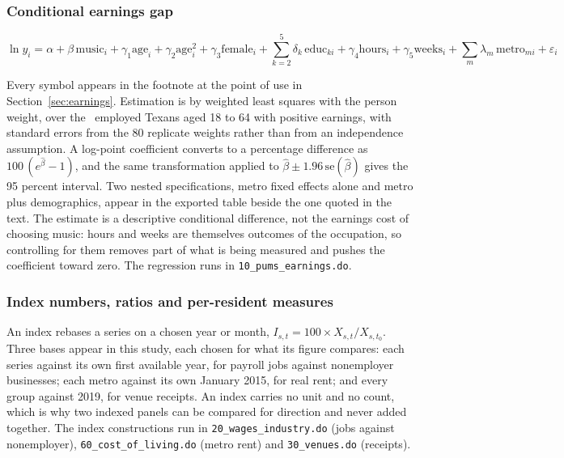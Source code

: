 \subsubsection*{Conditional earnings gap}

\[
\ln y_i = \alpha + \beta\,\mathrm{music}_i
  + \gamma_1 \mathrm{age}_i + \gamma_2 \mathrm{age}_i^{2}
  + \gamma_3 \mathrm{female}_i
  + \sum_{k=2}^{5}\delta_k\,\mathrm{educ}_{ki}
  + \gamma_4 \mathrm{hours}_i + \gamma_5 \mathrm{weeks}_i
  + \sum_{m}\lambda_m\,\mathrm{metro}_{mi} + \varepsilon_i
\]

Every symbol appears in the footnote at the point of use in
Section~\ref{sec:earnings}. Estimation is by weighted least squares with the
person weight, over the \NPumsRegN\ employed Texans aged 18 to 64 with
positive earnings, with standard errors from the 80 replicate weights
rather than from an independence assumption. A log-point coefficient
converts to a percentage difference as \(100\,(e^{\hat\beta} - 1)\), and the
same transformation applied to \(\hat\beta \pm 1.96\,\mathrm{se}(\hat\beta)\)
gives the 95 percent interval. Two nested specifications, metro fixed
effects alone and metro plus demographics, appear in the exported table
beside the one quoted in the text. The estimate is a descriptive conditional
difference, not the earnings cost of choosing music: hours and weeks are
themselves outcomes of the occupation, so controlling for them removes part
of what is being measured and pushes the coefficient toward zero. The
regression runs in \texttt{10\_pums\_earnings.do}.

\subsubsection*{Index numbers, ratios and per-resident measures}

An index rebases a series on a chosen year or month,
\(I_{s,t} = 100 \times X_{s,t}/X_{s,t_0}\). Three bases appear in this
study, each chosen for what its figure compares: each series against its
own first available year, for payroll jobs against nonemployer businesses;
each metro against its own January 2015, for real rent; and every group
against 2019, for venue receipts. An index carries no unit and no count,
which is why two indexed panels can be compared for direction and never
added together. The index constructions run in
\texttt{20\_wages\_industry.do} (jobs against nonemployer),
\texttt{60\_cost\_of\_living.do} (metro rent) and \texttt{30\_venues.do}
(receipts).


